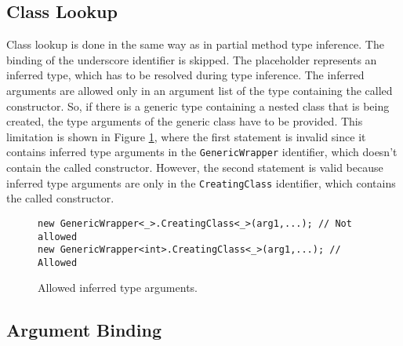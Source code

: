 \subsection{Class Lookup}

Class lookup is done in the same way as in partial method type inference. 
The binding of the underscore identifier is skipped. 
The placeholder represents an inferred type, which has to be resolved during type inference. 
The inferred arguments are allowed only in an argument list of the type containing the called constructor.
So, if there is a generic type containing a nested class that is being created, the type arguments of the generic class have to be provided. 
This limitation is shown in Figure \ref{img59:TypeArgList}, where the first statement is invalid since it contains inferred type arguments in the \texttt{GenericWrapper} identifier, which doesn’t contain the called constructor. 
However, the second statement is valid because inferred type arguments are only in the \texttt{CreatingClass} identifier, which contains the called constructor.
\begin{figure}[h!]
\begin{lstlisting}[style=csharp, mathescape=true]
new GenericWrapper<_>.CreatingClass<_>(arg1,...); // Not allowed
new GenericWrapper<int>.CreatingClass<_>(arg1,...); // Allowed
\end{lstlisting}
\caption{Allowed inferred type arguments.}
\label{img59:TypeArgList}
\end{figure}

\subsection{Argument Binding}

